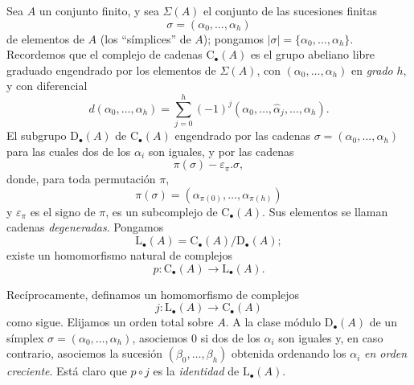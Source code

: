 \documentclass[oneside]{amsart}
\let\EGAOriginalLabel\label
\renewcommand{\label}[1]{\phantomsection\EGAOriginalLabel{#1}}
\begin{document}
\begin{env}[11.8.1]
\label{0.11.8.1}
Sea $A$ un conjunto finito, y sea $\Sigma(A)$ el conjunto de las sucesiones
finitas
\[
  \sigma=(\alpha_0,\ldots,\alpha_h)
\]
de elementos de $A$ (los ``símplices'' de $A$); pongamos
$|\sigma|=\{\alpha_0,\ldots,\alpha_h\}$.
Recordemos que el complejo de cadenas $\mathrm{C}_\bullet(A)$ es el grupo abeliano
libre graduado engendrado por los elementos de $\Sigma(A)$, con
$(\alpha_0,\ldots,\alpha_h)$ en \emph{grado} $h$, y con diferencial
\[
  d(\alpha_0,\ldots,\alpha_h)
  =
  \sum_{j=0}^{h}(-1)^j
  (\alpha_0,\ldots,\widehat{\alpha}_j,\ldots,\alpha_h).
\]
El subgrupo $\mathrm{D}_\bullet(A)$ de $\mathrm{C}_\bullet(A)$ engendrado
por las cadenas $\sigma=(\alpha_0,\ldots,\alpha_h)$ para las cuales dos de los
$\alpha_i$ son iguales, y por las cadenas
\[
  \pi(\sigma)-\varepsilon_\pi.\sigma,
\]
donde, para toda permutación $\pi$,
\[
  \pi(\sigma)
  =
  (\alpha_{\pi(0)},\ldots,\alpha_{\pi(h)})
\]
y $\varepsilon_\pi$ es el signo de $\pi$, es un subcomplejo de
$\mathrm{C}_\bullet(A)$.
Sus elementos se llaman cadenas \emph{degeneradas}.
Pongamos
\[
  \mathrm{L}_\bullet(A)
  =
  \mathrm{C}_\bullet(A)/\mathrm{D}_\bullet(A);
\]
existe un homomorfismo natural de complejos
\[
  p:\mathrm{C}_\bullet(A)\longrightarrow\mathrm{L}_\bullet(A).
\]

Recíprocamente, definamos un homomorfismo de complejos
\[
  j:\mathrm{L}_\bullet(A)\longrightarrow\mathrm{C}_\bullet(A)
\]
como sigue.
Elijamos un orden total sobre $A$.
A la clase módulo $\mathrm{D}_\bullet(A)$ de un símplex
$\sigma=(\alpha_0,\ldots,\alpha_h)$, asociemos $0$ si dos de los
$\alpha_i$ son iguales y, en caso contrario, asociemos la sucesión
$(\beta_0,\ldots,\beta_h)$ obtenida ordenando los $\alpha_i$ \emph{en
orden creciente}.
Está claro que $p\circ j$ es la \emph{identidad} de
$\mathrm{L}_\bullet(A)$.
\end{env}
\end{document}
